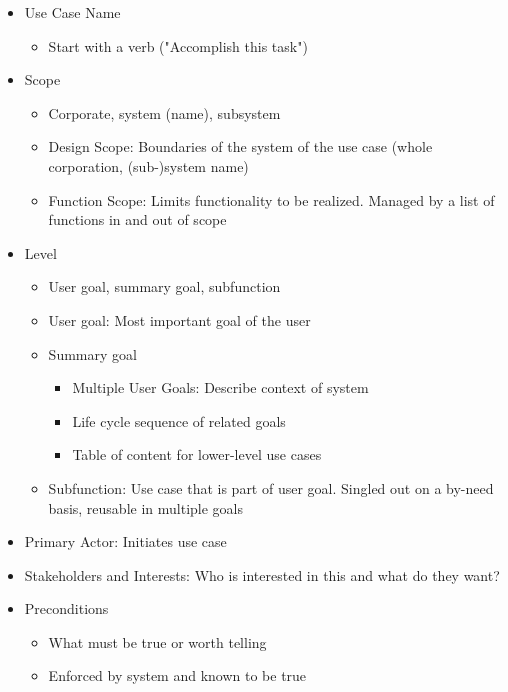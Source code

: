 \documentclass[
../../Software_Engineering_Summary.tex,
]
{subfiles}
\begin{document}
\begin{greenbox}
    \begin{itemize}
        \item Use Case Name
        \begin{itemize}
            \item Start with a verb ("Accomplish this task")
        \end{itemize}
        \item Scope
        \begin{itemize}
            \item Corporate, system (name), subsystem
            \item Design Scope: Boundaries of the system of the use case (whole corporation, (sub-)system name)
            \item Function Scope: Limits functionality to be realized. Managed by a list of functions in and out of scope
        \end{itemize}
        \item Level
        \begin{itemize}
            \item User goal, summary goal, subfunction
            \item User goal: Most important goal of the user
            \item Summary goal
            \begin{itemize}
                \item Multiple User Goals: Describe context of system
                \item Life cycle sequence of related goals
                \item Table of content for lower-level use cases
            \end{itemize}
            \item Subfunction: Use case that is part of user goal. Singled out on a by-need basis, reusable in multiple goals
        \end{itemize}
        \item Primary Actor: Initiates use case
        \item Stakeholders and Interests: Who is interested in this and what do they want?
        \item Preconditions
        \begin{itemize}
            \item What must be true or worth telling
            \item Enforced by system and known to be true

\end{itemize}
\end{itemize}
\end{greenbox}
\end{document}
